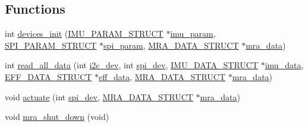 \subsection*{Functions}
\begin{DoxyCompactItemize}
\item 
int \hyperlink{communication_01_07C_xC3_xB3pia_01em_01conflito_01de_01Caio_01Gustavo_01Mesquita_01Angelo_012013-04-28_08_8h_a2d1e523ff70db11ca4096f97af5da000}{devices\-\_\-init} (\hyperlink{structIMU__PARAM__STRUCT}{I\-M\-U\-\_\-\-P\-A\-R\-A\-M\-\_\-\-S\-T\-R\-U\-C\-T} $\ast$\hyperlink{main2_8c_a9c6b2109fb9402446f92995db60951b5}{imu\-\_\-param}, \hyperlink{structSPI__PARAM__STRUCT}{S\-P\-I\-\_\-\-P\-A\-R\-A\-M\-\_\-\-S\-T\-R\-U\-C\-T} $\ast$\hyperlink{main2_8c_adec2468b88cf50b20e5cf399a3b7e994}{spi\-\_\-param}, \hyperlink{structMRA__DATA__STRUCT}{M\-R\-A\-\_\-\-D\-A\-T\-A\-\_\-\-S\-T\-R\-U\-C\-T} $\ast$\hyperlink{main2_8c_abc42e18d2909e9bc119316283f4ed9db}{mra\-\_\-data})
\item 
int \hyperlink{communication_01_07C_xC3_xB3pia_01em_01conflito_01de_01Caio_01Gustavo_01Mesquita_01Angelo_012013-04-28_08_8h_a5f0316a5f70c7e369541e996802603b4}{read\-\_\-all\-\_\-data} (int \hyperlink{CommunicationV0_2communication_8c_a7751bd45ac1064efb35adf1f19c25db8}{i2c\-\_\-dev}, int \hyperlink{CommunicationV0_2communication_8c_a4788f0a5355494bc6c13690e28f43783}{spi\-\_\-dev}, \hyperlink{structIMU__DATA__STRUCT}{I\-M\-U\-\_\-\-D\-A\-T\-A\-\_\-\-S\-T\-R\-U\-C\-T} $\ast$\hyperlink{threads__linux_8c_a3cfea12cbe9ca7f1681c950e4cd68606}{imu\-\_\-data}, \hyperlink{structEFF__DATA__STRUCT}{E\-F\-F\-\_\-\-D\-A\-T\-A\-\_\-\-S\-T\-R\-U\-C\-T} $\ast$\hyperlink{main2_8c_a5650ece8c3a277c7f158d75ae65265fa}{eff\-\_\-data}, \hyperlink{structMRA__DATA__STRUCT}{M\-R\-A\-\_\-\-D\-A\-T\-A\-\_\-\-S\-T\-R\-U\-C\-T} $\ast$\hyperlink{main2_8c_abc42e18d2909e9bc119316283f4ed9db}{mra\-\_\-data})
\item 
void \hyperlink{communication_01_07C_xC3_xB3pia_01em_01conflito_01de_01Caio_01Gustavo_01Mesquita_01Angelo_012013-04-28_08_8h_a1d5f01d0124cff7030b5c4951b4bbefa}{actuate} (int \hyperlink{CommunicationV0_2communication_8c_a4788f0a5355494bc6c13690e28f43783}{spi\-\_\-dev}, \hyperlink{structMRA__DATA__STRUCT}{M\-R\-A\-\_\-\-D\-A\-T\-A\-\_\-\-S\-T\-R\-U\-C\-T} $\ast$\hyperlink{main2_8c_abc42e18d2909e9bc119316283f4ed9db}{mra\-\_\-data})
\item 
void \hyperlink{communication_01_07C_xC3_xB3pia_01em_01conflito_01de_01Caio_01Gustavo_01Mesquita_01Angelo_012013-04-28_08_8h_a8da2a9706cfdbe1a7fae96aac9e4f516}{mra\-\_\-shut\-\_\-down} (void)
\end{DoxyCompactItemize}


